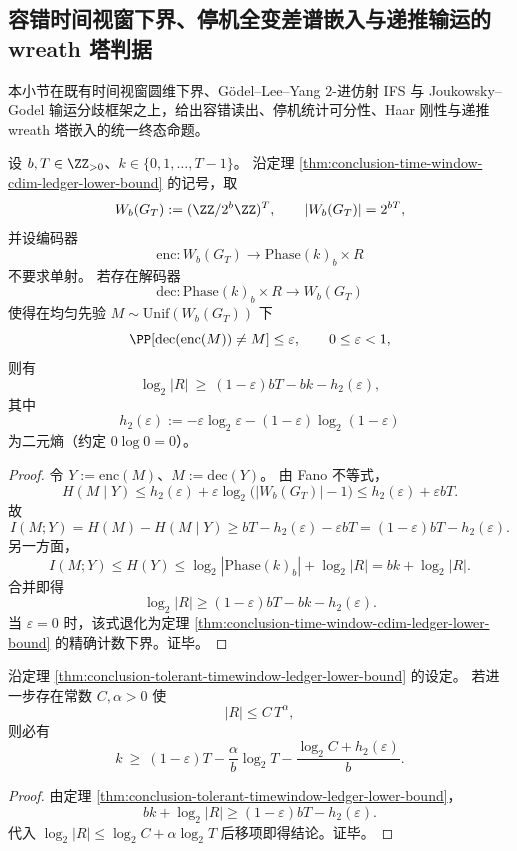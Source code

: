 \subsection{容错时间视窗下界、停机全变差谱嵌入与递推输运的 wreath 塔判据}\label{subsec:conclusion-tolerant-timewindow-halting-tv-haar-galois-iterated-wreath}
本小节在既有时间视窗圆维下界、Gödel--Lee--Yang \(2\)-进仿射 IFS 与 Joukowsky--Godel 输运分歧框架之上，给出容错读出、停机统计可分性、Haar 刚性与递推 wreath 塔嵌入的统一终态命题。

\begin{theorem}\label{thm:conclusion-tolerant-timewindow-ledger-lower-bound}
设 \(b,T\in\ZZ_{>0}\)、\(k\in\{0,1,\dots,T-1\}\)。
沿定理 \ref{thm:conclusion-time-window-cdim-ledger-lower-bound} 的记号，取
\[
W_b(G_T):=(\ZZ/2^b\ZZ)^T,\qquad |W_b(G_T)|=2^{bT},
\]
并设编码器
\[
\mathrm{enc}:W_b(G_T)\to \mathrm{Phase}(k)_b\times R
\]
不要求单射。
若存在解码器
\[
\mathrm{dec}:\mathrm{Phase}(k)_b\times R\to W_b(G_T)
\]
使得在均匀先验 \(M\sim\mathrm{Unif}(W_b(G_T))\) 下
\[
\PP[\mathrm{dec}(\mathrm{enc}(M))\neq M]\le \varepsilon,\qquad 0\le \varepsilon<1,
\]
则有
\[
\log_2|R|
\ \ge\
(1-\varepsilon)bT-bk-h_2(\varepsilon),
\]
其中
\[
h_2(\varepsilon):=-\varepsilon\log_2\varepsilon-(1-\varepsilon)\log_2(1-\varepsilon)
\]
为二元熵（约定 \(0\log 0=0\)）。
\end{theorem}
\begin{proof}
令 \(Y:=\mathrm{enc}(M)\)、\(\widehat M:=\mathrm{dec}(Y)\)。
由 Fano 不等式，
\[
H(M\mid Y)\le h_2(\varepsilon)+\varepsilon\log_2\bigl(|W_b(G_T)|-1\bigr)
\le h_2(\varepsilon)+\varepsilon bT.
\]
故
\[
I(M;Y)=H(M)-H(M\mid Y)
\ge bT-h_2(\varepsilon)-\varepsilon bT
=(1-\varepsilon)bT-h_2(\varepsilon).
\]
另一方面，
\[
I(M;Y)\le H(Y)\le \log_2|\mathrm{Phase}(k)_b|+\log_2|R|
=bk+\log_2|R|.
\]
合并即得
\[
\log_2|R|\ge (1-\varepsilon)bT-bk-h_2(\varepsilon).
\]
当 \(\varepsilon=0\) 时，该式退化为定理 \ref{thm:conclusion-time-window-cdim-ledger-lower-bound} 的精确计数下界。证毕。
\end{proof}

\begin{corollary}[多项式残差账本下的近似时间圆维下界]\label{cor:conclusion-polynomial-ledger-approx-time-cdim-bound}
沿定理 \ref{thm:conclusion-tolerant-timewindow-ledger-lower-bound} 的设定。
若进一步存在常数 \(C,\alpha>0\) 使
\[
|R|\le C\,T^\alpha,
\]
则必有
\[
k\ \ge\
(1-\varepsilon)T-\frac{\alpha}{b}\log_2 T-\frac{\log_2 C+h_2(\varepsilon)}{b}.
\]
\end{corollary}
\begin{proof}
由定理 \ref{thm:conclusion-tolerant-timewindow-ledger-lower-bound}，
\[
bk+\log_2|R|
\ge
(1-\varepsilon)bT-h_2(\varepsilon).
\]
代入 \(\log_2|R|\le \log_2 C+\alpha\log_2 T\) 后移项即得结论。证毕。
\end{proof}

